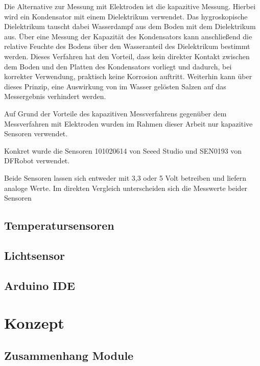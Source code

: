 \documentclass[
    load-dhbw-templates,
    load-preamble = true,
    auto-intro-pages = all,
    add-tocs-to-toc,
    debug = true,
    language = english,
    mainlanguage = ngerman,
    add-bibliography,
    bib-file = dhbw-source.bib,
    biblatex/style = numeric,
    print- = false
]{iodhbwm}
\begin{document}
        Die Alternative zur Messung mit Elektroden ist die kapazitive Messung.
        Hierbei wird ein Kondensator mit einem Dielektrikum verwendet. Das hygroskopische Dielektrikum tauscht dabei Wasserdampf aus dem Boden mit dem Dielektrikum aus. Über eine Messung der Kapazität des Kondensators kann anschließend die relative Feuchte des Bodens über den Wasseranteil des Dielektrikum bestimmt werden. %
        Dieses Verfahren hat den Vorteil, dass kein direkter Kontakt zwischen dem Boden und den Platten des Kondensators vorliegt und dadurch, bei korrekter Verwendung, praktisch keine Korrosion auftritt.
        Weiterhin kann über dieses Prinzip, eine Auswirkung von im Wasser gelösten Salzen auf das Messergebnis verhindert werden.

        Auf Grund der Vorteile des kapazitiven Messverfahrens gegenüber dem Messverfahren mit Elektroden wurden im Rahmen dieser Arbeit nur kapazitive Sensoren verwendet.


        Konkret wurde die Sensoren 101020614 von Seeed Studio und SEN0193 von DFRobot verwendet.


        Beide Sensoren lassen sich entweder mit 3,3 oder 5 Volt betreiben und liefern analoge Werte.
        Im direkten Vergleich unterscheiden sich die Messwerte beider Sensoren %
        
        \subsection{Temperatursensoren}
        \subsection{Lichtsensor}
        \subsection{Arduino IDE}
    \section{Konzept}
        \subsection{Zusammenhang Module}
\end{document}
